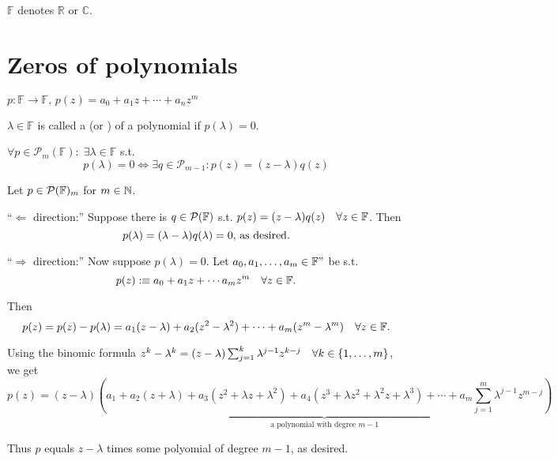 
$\mathbb{F}$ denotes $\mathbb{R}$ or $\mathbb{C}$.

\section{Zeros of polynomials}
$p: \mathbb{F} \to \mathbb{F}, \, p(z) = a_0 + a_1z + \cdots + a_n z^m$

\setcounter{thm}{4}
\begin{mydef}
  $\lambda \in \mathbb{F}$ is called a   (or ) of a polynomial if $p(\lambda) = 0$.
\end{mydef}

\setcounter{thm}{5}
\begin{thm}
  \label{factororing-out-zeros-of-a-polynomial-always-possible}
  $\forall p \in \mathcal{P}_m(\mathbb{F}): \; \exists \lambda \in \mathbb{F}$ s.t.
  \begin{equation}
  	p(\lambda) = 0 \iff \exists q \in \mathcal{P}_{m-1}: p(z) = (z-\lambda)q(z)
  \end{equation}
\end{thm}
\begin{prf} Let $p\in \mathcal{P}(\mathbb{F})_m$ for $m\in \mathbb{N}$.
  
  ``$\Leftarrow$ direction:'' Suppose there is $q \in \mathcal{P}(\mathbb{F})$ s.t. $p(z) = (z-\lambda)q(z) \quad \forall z \in \mathbb{F}$. Then
  \begin{equation}
    p(\lambda) = (\lambda -\lambda)q(\lambda) = 0,$ as desired.$
  \end{equation}
  
  ``$\Rightarrow$ direction:'' Now suppose $p(\lambda)=0$. Let $a_0, a_1, \ldots, a_m \in \mathbb{F}"$ be s.t.
  \begin{equation}
    p(z) :\equiv a_0 + a_1z + \cdots a_mz^m \quad \forall z \in  \mathbb{F}.
  \end{equation}
  
  Then
  \begin{equation}
    \label{eq: second formula of pz: pz = pz - plambda}
    p(z) = p(z)- p(\lambda) = a_1 (z-\lambda) + a_2 (z^2 - \lambda^2) + \cdots+ a_m (z^m- \lambda^m) \quad \forall z \in \mathbb{F}.
  \end{equation}
  
  Using the binomic formula 
  $z^k - \lambda^k = (z-\lambda) \sum_{j=1}^{k} \lambda^{j-1}z^{k-j} \quad \forall k\in \{ 1, \ldots, m \}$, we get 
  \begin{equation}
    p(z) = (z-\lambda)
    \underbrace{
      \left(
        a_1 + a_2 (z+\lambda) + a_3(z^2 + \lambda z + \lambda^2) +
        a_4 (z^3 + \lambda z^2 + \lambda^2 z + \lambda^3) 
        + \cdots +
        a_m \sum_{j=1}^{m} \lambda^{j-1} z^{m-j}
      \right)}_{\text{a polynomial with degree $m-1$}}
  \end{equation}
  
  Thus $p$ equals $z-\lambda$ times some polyomial of degree $m-1$, as desired.
\end{prf}

